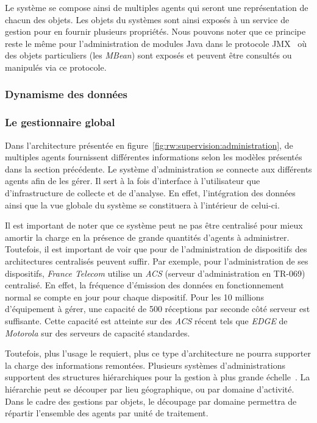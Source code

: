 Le système se compose ainsi de multiples agents qui seront une représentation de chacun des objets. Les objets du systèmes sont ainsi exposés à un service de gestion pour en fournir plusieurs propriétés. Nous pouvons noter que ce principe reste le même pour l'administration de modules Java dans le protocole JMX~\cite{Sun:JMX} où des objets particuliers (les \textit{MBean}) sont exposés et peuvent être consultés ou manipulés via ce protocole.

\subsubsection{Dynamisme des données}


\subsubsection{Le gestionnaire global}
Dans l'architecture présentée en figure~\ref{fig:rw:supervision:administration}, de multiples agents fournissent différentes informations selon les modèles présentés dans la section précédente. Le système d'administration se connecte aux différents agents afin de les gérer. Il sert à la fois d'interface à l'utilisateur que d'infrastructure de collecte et de d'analyse. En effet, l'intégration des données ainsi que la vue globale du système se constituera à l'intérieur de celui-ci.

Il est important de noter que ce système peut ne pas être centralisé pour mieux amortir la charge en la présence de grande quantités d'agents à administrer. Toutefois, il est important de voir que pour de l'administration de dispositifs des architectures centralisés peuvent suffir. Par exemple, pour l'administration de ses dispositifs, \textit{France Telecom} utilise un \textit{ACS} (serveur d'administration en TR-069) centralisé. En effet, la fréquence d'émission des données en fonctionnement normal se compte en jour pour chaque dispositif. Pour les 10 millions d'équipement à gérer, une capacité de 500 réceptions par seconde côté serveur est suffisante. Cette capacité est atteinte sur des \textit{ACS} récent tels que \textit{EDGE} de \textit{Motorola} sur des serveurs de capacité standardes.

Toutefois, plus l'usage le requiert, plus ce type d'architecture ne pourra supporter la charge des informations remontées. Plusieurs systèmes d'administrations supportent des structures hiérarchiques pour la gestion à plus grande échelle~\cite{Kessis:management}. La hiérarchie peut se découper par lieu géographique, ou par domaine d'activité. Dans le cadre des gestions par objets, le découpage par domaine permettra de répartir l'ensemble des agents par unité de traitement.

